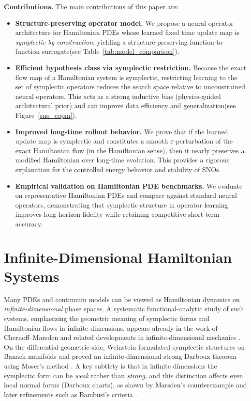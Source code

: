 \documentclass{article}
\theoremstyle{plain}
\theoremstyle{definition}
\theoremstyle{remark}
\begin{document}
\textbf{Contributions.}
The main contributions of this paper are:
\begin{itemize}
  \item \textbf{Structure-preserving operator model.}
  We propose a neural-operator architecture for Hamiltonian PDEs whose learned fixed time update map is \emph{symplectic by construction}, yielding a structure-preserving function-to-function surrogate(see Table~\ref{tab:model_comparison}).
  \item \textbf{Efficient hypothesis class via symplectic restriction.}
  Because the exact flow map of a Hamiltonian system is symplectic, restricting learning to the set of symplectic operators reduces the search space relative to unconstrained neural operators.
  This acts as a strong inductive bias (physics-guided architectural prior) and can improve data efficiency and generalization(see Figure~\ref{sno_copm}).
  \item \textbf{Improved long-time rollout behavior.}
  We prove that if the learned update map is symplectic and constitutes a smooth $\varepsilon$-perturbation of the exact Hamiltonian flow (in the Hamiltonian sense), then it nearly preserves a modified Hamiltonian over long-time evolution. This provides a rigorous explanation for the controlled energy behavior and stability of SNOs.

  \item \textbf{Empirical validation on Hamiltonian PDE benchmarks.}
  We evaluate on representative Hamiltonian PDEs and compare against standard neural operators, demonstrating that symplectic structure in operator learning improves long-horizon fidelity while retaining competitive short-term accuracy.
\end{itemize}



\section{Infinite-Dimensional Hamiltonian Systems}
\label{sec:inf-dim-hamiltonian}

Many PDEs and continuum models can be viewed as
Hamiltonian dynamics on \emph{infinite-dimensional} phase spaces.
A systematic functional-analytic study of such systems, emphasizing the geometric meaning of
symplectic forms and Hamiltonian flows in infinite dimensions, appears already in the work of
Chernoff--Marsden and related developments in infinite-dimensional mechanics
\cite{chernoffMarsden1974properties}.
On the differential-geometric side, Weinstein formulated symplectic structures on Banach manifolds
and proved an infinite-dimensional strong Darboux theorem using Moser's method
\cite{weinstein1969symplecticBanach}.
A key subtlety is that in infinite dimensions the symplectic form can be \emph{weak} rather than \emph{strong},
and this distinction affects even local normal forms (Darboux charts), as shown by Marsden's counterexample
\cite{marsden1972darbouxFails} and later refinements such as Bambusi's criteria \cite{bambusi1999darbouxWeak}.
\end{document}
